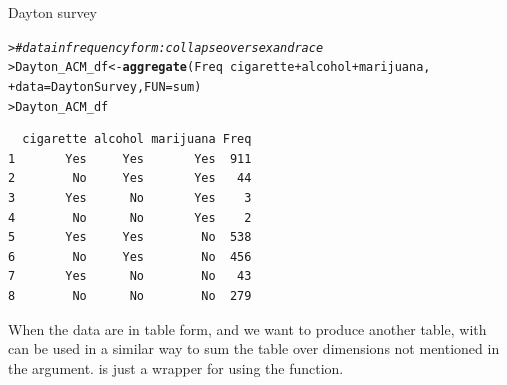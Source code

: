 \documentclass[10pt,krantz2]{krantz}\usepackage[]{graphicx}\usepackage[]{color}
\makeatletter
\newcommand{\hlcom}[1]{\textcolor[rgb]{0.678,0.584,0.686}{\textit{#1}}}%
\newcommand{\hlopt}[1]{\textcolor[rgb]{0,0,0}{#1}}%
\newcommand{\hlstd}[1]{\textcolor[rgb]{0.345,0.345,0.345}{#1}}%
\newcommand{\hlkwb}[1]{\textcolor[rgb]{0.69,0.353,0.396}{#1}}%
\newcommand{\hlkwc}[1]{\textcolor[rgb]{0.333,0.667,0.333}{#1}}%
\newcommand{\hlkwd}[1]{\textcolor[rgb]{0.737,0.353,0.396}{\textbf{#1}}}%
\newenvironment{kframe}{%
 \def\at@end@of@kframe{}%
 \ifinner\ifhmode%
  \def\at@end@of@kframe{\end{minipage}}%
  \begin{minipage}{\columnwidth}%
 \fi\fi%
 \def\FrameCommand##1{\hskip\@totalleftmargin \hskip-\fboxsep
 \colorbox{shadecolor}{##1}\hskip-\fboxsep
     \hskip-\linewidth \hskip-\@totalleftmargin \hskip\columnwidth}%
 \MakeFramed {\advance\hsize-\width
   \@totalleftmargin\z@ \linewidth\hsize
   \@setminipage}}%
 {\par\unskip\endMakeFramed%
 \at@end@of@kframe}
\newenvironment{knitrout}{}{} %
\renewenvironment{knitrout}{\small\renewcommand{\baselinestretch}{.85}}{} %
\makeatother
\begin{document}
\begin{Example}[dayton1]{Dayton survey}
\begin{knitrout}
\color{fgcolor}\begin{kframe}
\begin{alltt}
\hlstd{> }\hlcom{# data in frequency form: collapse over sex and race}
\hlstd{> }\hlstd{Dayton_ACM_df} \hlkwb{<-} \hlkwd{aggregate}\hlstd{(Freq} \hlopt{~} \hlstd{cigarette} \hlopt{+} \hlstd{alcohol} \hlopt{+} \hlstd{marijuana,}
\hlstd{+ }                           \hlkwc{data} \hlstd{= DaytonSurvey,} \hlkwc{FUN} \hlstd{= sum)}
\hlstd{> }\hlstd{Dayton_ACM_df}
\end{alltt}
\begin{verbatim}
  cigarette alcohol marijuana Freq
1       Yes     Yes       Yes  911
2        No     Yes       Yes   44
3       Yes      No       Yes    3
4        No      No       Yes    2
5       Yes     Yes        No  538
6        No     Yes        No  456
7       Yes      No        No   43
8        No      No        No  279
\end{verbatim}
\end{kframe}
\end{knitrout}
\end{Example}

When the data are in table form, and we want to produce another
table,  with  can be used in a similar way
to sum the table over dimensions not mentioned in the 
argument.   is just a wrapper for 
using the  function.
\end{document}
